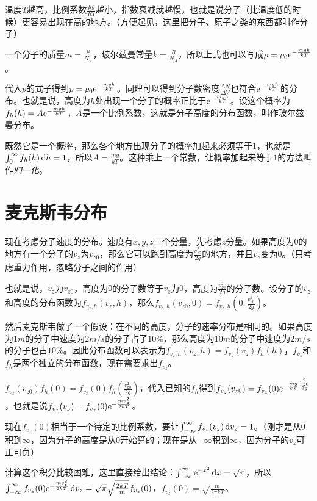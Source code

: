 温度$T$越高，比例系数$\frac{\mu g}{R T}$越小，指数衰减就越慢，也就是说分子（比温度低的时候）更容易出现在高的地方。（方便起见，这里把分子、原子之类的东西都叫作分子）

一个分子的质量$m=\frac{\mu}{N_A}$，玻尔兹曼常量$k=\frac{R}{N_A}$，所以上式也可以写成$\rho=\rho_0 \mathrm{e}^{-\frac{m g h}{k T}}$。

代入$p$的式子得到$p=p_0 \mathrm{e}^{-\frac{m g h}{k T}}$。同理可以得到分子数密度$\frac{\Delta N}{\Delta V}$也符合$\mathrm{e}^{-\frac{m g h}{k T}}$的分布。也就是说，高度为$h$处出现一个分子的概率正比于$\mathrm{e}^{-\frac{m g h}{k T}}$。设这个概率为$f_h(h)=A \mathrm{e}^{-\frac{m g h}{k T}}$，$A$是一个比例系数，这就是分子高度的分布函数，叫作玻尔兹曼分布。

既然它是一个概率，那么各个地方出现分子的概率加起来必须等于$1$，也就是$\int_0^\infty f_h(h) \mathop{}\!\mathrm{d} h=1$，所以$A=\frac{m g}{k T}$。这种乘上一个常数，让概率加起来等于$1$的方法叫作\emph{归一化}。
\section{麦克斯韦分布}
现在考虑分子速度的分布。速度有$x,y,z$三个分量，先考虑$z$分量。如果高度为$0$的地方有一个分子的$v_z$为$v_{z 0}$，那么它可以跑到高度为$\frac{v_{z 0}^2}{2 g}$的地方，并且$v_z$变为$0$。（只考虑重力作用，忽略分子之间的作用）

也就是说，$v_z$为$v_{z 0}$，高度为$0$的分子数等于$v_z$为$0$，高度为$\frac{v_{z 0}^2}{2 g}$的分子数。设分子的$v_z$和高度的分布函数为$f_{v_z,h}(v_z,h)$，那么$f_{v_z,h}(v_{z 0},0)=f_{v_z,h}(0,\frac{v_{z 0}^2}{2 g})$。

然后麦克斯韦做了一个假设：在不同的高度，分子的速率分布是相同的。如果高度为$1 \unit{m}$的分子中速度为$2 \unit{m/s}$的分子占了$10\%$，那么高度为$10 \unit{m}$的分子中速度为$2 \unit{m/s}$的分子也占$10\%$。因此分布函数可以表示为$f_{v_z,h}(v_z,h)=f_{v_z}(v_z) f_h(h)$，$f_{v_z}$和$f_h$是两个独立的分布函数，现在需要求出$f_{v_z}$。

$f_{v_z}(v_{z 0}) f_h(0)=f_{v_z}(0) f_h(\frac{v_{z 0}^2}{2 g})$，代入已知的$f_h$得到$f_{v_z}(v_{z 0})=f_{v_z}(0) \mathrm{e}^{-\frac{m g}{k T} \frac{v_{z 0}^2}{2 g}}$，也就是说$f_{v_z}(v_z)=f_{v_z}(0) \mathrm{e}^{-\frac{m v_z^2}{2 k T}}$。

现在$f_{v_z}(0)$相当于一个待定的比例系数，要让$\int_{-\infty}^\infty f_{v_z}(v_z) \mathop{}\!\mathrm{d} v_z=1$。（刚才是从$0$积到$\infty$，因为分子的高度是从$0$开始算的；现在是从$-\infty$积到$\infty$，因为分子的$v_z$可正可负）

计算这个积分比较困难，这里直接给出结论：$\int_{-\infty}^\infty \mathrm{e}^{-x^2} \mathop{}\!\mathrm{d} x=\sqrt{\pi}$，所以$\int_{-\infty}^\infty f_{v_z}(0) \mathrm{e}^{-\frac{m v_z^2}{2 k T}} \mathop{}\!\mathrm{d} v_z=\sqrt{\pi} \sqrt{\frac{2 k T}{m}} f_{v_z}(0)$，$f_{v_z}(0)=\sqrt{\frac{m}{2 \pi k T}}$。

